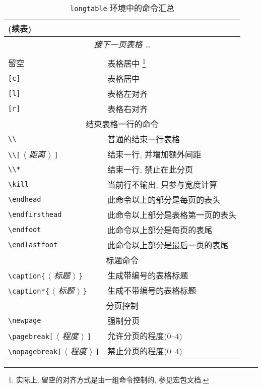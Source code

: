 \documentclass [nofonts]{ctexart}
\newcommand\meta[1]{\emph{$ \langle $ #1 $ \rangle $}}
\begin{document}
\begin{longtable}{|l|l|}
\caption{\texttt{longtable} 环境中的命令汇总}	\\
\hline
\endfirsthead

\multicolumn{2}{l}{(续表)}	\\
\hline
\endhead

\hline
\multicolumn{2}{c}{\itshape 接下一页表格 \dots}	\\
[2ex]
\endfoot

\hline
\endlastfoot

\multicolumn{2}{|c|}{环境的水平对齐可选项}	\\
\hline

留空	& 表格居中
\footnote{实际上, 留空的对齐方式是由一组命令控制的, 参见宏包文档.}	\\
\verb=[c]=	& 表格居中	\\
\verb=[l]=	& 表格左对齐\\
\verb=[r]=	& 表格右对齐\\
\hline
\multicolumn{2}{|c|}{结束表格一行的命令}	\\
\hline
\verb=\\=	& 普通的结束一行表格	\\
\verb=\\[= \meta{距离} \verb=]=	& 结束一行, 并增加额外间距	\\
\verb=\\*=	& 结束一行, 禁止在此分页	\\
\verb=\kill=	& 当前行不输出, 只参与宽度计算	\\
\verb=\endhead=	& 此命令以上的部分是每页的表头	\\
\verb=\endfirsthead=	& 此命令以上部分是表格第一页的表头	\\
\verb=\endfoot=	& 此命令以上部分是每页的表尾	\\
\verb=\endlastfoot=	& 此命令以上部分是最后一页的表尾	\\
\hline
\multicolumn{2}{|c|}{标题命令}	\\
\hline
\verb=\caption{= \meta{标题} \verb=}=	& 生成带编号的表格标题	\\
\verb=\caption*{= \meta{标题} \verb=}=	& 生成不带编号的表格标题\\
\hline
\multicolumn{2}{|c|}{分页控制}	\\
\hline
\verb=\newpage=	& 强制分页	\\
\verb=\pagebreak[= \meta{程度} \verb=]=	& 允许分页的程度(0--4)	\\
\verb=\nopagebreak[= \meta{程度} \verb=]=	& 禁止分页的程度(0--4)	\\

\end{longtable}
\end{document}
